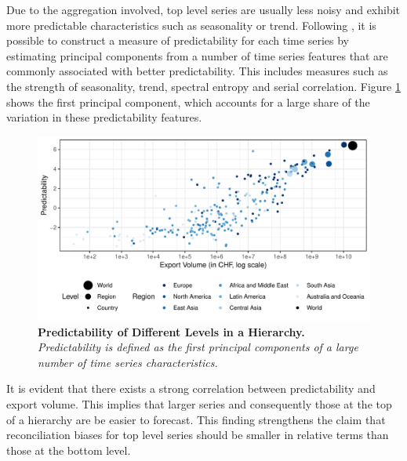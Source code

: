 \documentclass[a4paper,fleqn,11pt]{article}
\begin{document}
Due to the aggregation involved, top level series are usually less noisy and exhibit more predictable characteristics such as seasonality or trend. Following \cite{Kang2017}, it is possible to construct a measure of predictability for each time series by estimating principal components from a number of time series features that are commonly associated with better predictability. This includes measures such as the strength of seasonality, trend, spectral entropy and serial correlation. Figure \ref{fig:feature} shows the first principal component, which accounts for a large share of the variation in these predictability features.
\begin{figure}[H]
	\includegraphics[width=\textwidth]{fig/fig_confetti}
	\caption[Predictability of Different Levels in a Hierarchy]{\textbf{Predictability of Different Levels in a Hierarchy.}\textit{ Predictability is defined as the first principal components of a large number of time series characteristics.}} \label{fig:feature}
\end{figure}
It is evident that there exists a strong correlation between predictability and export volume. This implies that larger series and consequently those at the top of a hierarchy are be easier to forecast. This finding strengthens the claim that reconciliation biases for top level series should be smaller in relative terms than those at the bottom level.\\
\end{document}

